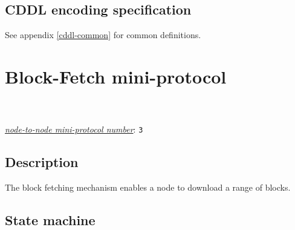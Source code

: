 \subsection{CDDL encoding specification}

See appendix \ref{cddl-common} for common definitions.

\section{Block-Fetch mini-protocol}
\label{block-fetch-protocol}
\\
\\
\hyperref[table:node-to-node-protocol-numbers]{\textit{node-to-node mini-protocol number}}: \texttt{3}\\

\renewcommand{\StIdle}{\state{StIdle}}
\renewcommand{\StBusy}{\state{StBusy}}
\newcommand{\StStreaming}{\state{StStreaming}}
\renewcommand{\StDone}{\state{StDone}}
\newcommand{\MsgRequestRange}{\msg{MsgRequestRange}}
\newcommand{\MsgStartBatch}{\msg{MsgStartBatch}}
\newcommand{\MsgNoBlocks}{\msg{MsgNoBlocks}}
\newcommand{\MsgBlock}{\msg{MsgBlock}}
\newcommand{\MsgBatchDone}{\msg{MsgBatchDone}}
\newcommand{\MsgClientDone}{\msg{MsgClientDone}}

\subsection{Description}

The block fetching mechanism enables a node to download a range of blocks.

\subsection{State machine}

